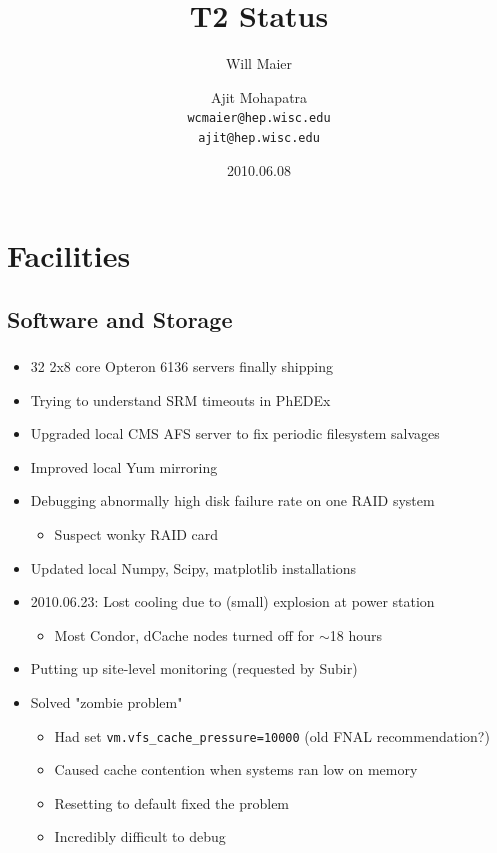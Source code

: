 \documentclass{beamer}
\title{T2 Status}
\author[Maier, Mohapatra]{
    Will Maier \and Ajit Mohapatra\\
    {\tt wcmaier@hep.wisc.edu}\\
    {\tt ajit@hep.wisc.edu}}
\institute[Wisconsin]{University of Wisconsin - High Energy Physics}
\date{2010.06.08}
\newcommand{\ca}{\ensuremath{\sim}}
\begin{document}
\begin{frame}
    \titlepage
\end{frame}


\section{Facilities}
\subsection{Software and Storage}
\begin{frame}
\frametitle{}

\begin{itemize}
	\item 32 2x8 core Opteron 6136 servers finally shipping
	\item Trying to understand SRM timeouts in PhEDEx
	\item Upgraded local CMS AFS server to fix periodic filesystem salvages
	\item Improved local Yum mirroring
	\item Debugging abnormally high disk failure rate on one RAID system
	\begin{itemize}
		\item Suspect wonky RAID card
	\end{itemize}
	\item Updated local Numpy, Scipy, matplotlib installations
	\item 2010.06.23: Lost cooling due to (small) explosion at power station
	\begin{itemize}
		\item Most Condor, dCache nodes turned off for \ca{}18 hours
	\end{itemize}
	\item Putting up site-level monitoring (requested by Subir)
	\item Solved "zombie problem"
	\begin{itemize}
		\item Had set {\tt vm.vfs\_cache\_pressure=10000} (old FNAL recommendation?)
		\item Caused cache contention when systems ran low on memory
		\item Resetting to default fixed the problem
		\item Incredibly difficult to debug
	\end{itemize}
\end{itemize}
\end{frame}
\end{document}
